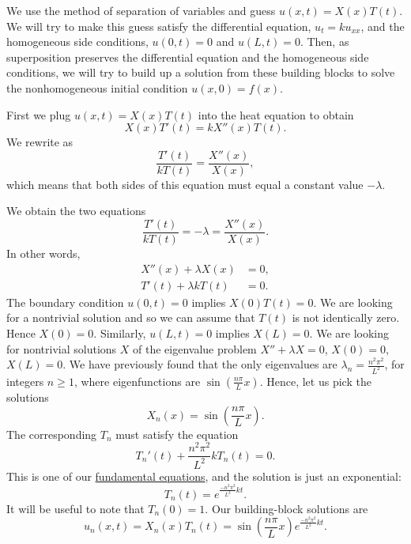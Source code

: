 \begin{exampleSol}
We use the method of separation of variables and guess $u(x,t) = X(x)T(t)$. 
We will try to make this guess satisfy the
differential equation, $u_t = k u_{xx}$, and the homogeneous side conditions,
$u(0,t) = 0$ and $u(L,t) = 0$.  Then, as superposition preserves the
differential equation and the homogeneous side conditions, we will try to
build up a solution from these building blocks to solve the
nonhomogeneous initial condition $u(x,0) = f(x)$.

First we plug $u(x,t) = X(x)T(t)$ into the heat equation to
obtain
\begin{equation*}
X(x)T'(t) = k X''(x)T(t) .
\end{equation*}
We rewrite as
\begin{equation*}
\frac{T'(t)}{k T(t)} =
\frac{X''(x)}{X(x)},
\end{equation*}
which means that both sides of this equation must equal a constant value $-\lambda$. 

We obtain the two equations
\begin{equation*}
\frac{T'(t)}{k T(t)} = -\lambda =
\frac{X''(x)}{X(x)} .
\end{equation*}
In other words,
\begin{align*}
X''(x) + \lambda X(x) &= 0 , \\
T'(t) + \lambda k T(t) &= 0 .
\end{align*}
The boundary condition $u(0,t) = 0$ implies $X(0)T(t) = 0$.  We are looking
for a nontrivial solution and so we can assume that $T(t)$ is not identically
zero.  Hence $X(0) = 0$.  Similarly, $u(L,t) = 0$ implies $X(L) = 0$.  We
are looking for nontrivial solutions $X$ of the eigenvalue problem
$X'' + \lambda X = 0$, $X(0) = 0$, $X(L) = 0$.  We have previously found that
the only eigenvalues are $\lambda_n = \frac{n^2 \pi^2}{L^2}$, for integers
$n \geq 1$,
where eigenfunctions are $\sin \left(\frac{n \pi}{L} x\right)$.  Hence, let us pick
the solutions
\begin{equation*}
X_n (x) = \sin \left(\frac{n \pi}{L} x \right) .
\end{equation*}
The corresponding $T_n$ must satisfy the equation
\begin{equation*}
T_n'(t) + \frac{n^2 \pi^2}{L^2} k T_n(t) = 0 .
\end{equation*}
This is one of our
\hyperref[subsection:fourfundamental]{fundamental equations},
and the solution is just
an exponential:
\begin{equation*}
T_n(t) = e^{\frac{-n^2 \pi^2}{L^2} k t} .
\end{equation*}
It will be useful to note that $T_n(0) = 1$.
Our building-block solutions are
\begin{equation*}
u_n(x,t) = X_n(x)T_n(t) =
\sin \left( \frac{n \pi}{L} x \right)
e^{\frac{-n^2 \pi^2}{L^2} k t} .
\end{equation*}


\end{exampleSol}
